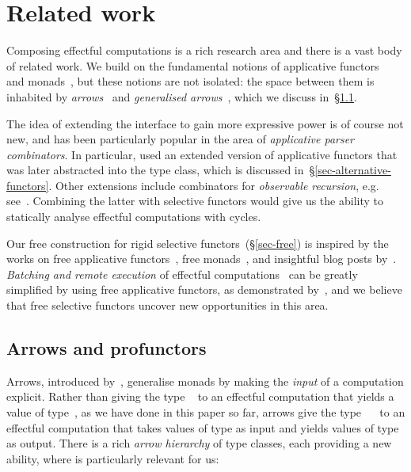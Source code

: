 \section{Related work}\label{sec-related}

Composing effectful computations is a rich research area and there is a vast
body of related work. We build on the fundamental notions of applicative
functors~\citep{mcbride2008applicative} and
monads~\citep{moggi1991notions,1995_wadler_monads}, but these notions are not
isolated: the space between them is inhabited by
\emph{arrows}~\citep{hughes2000arrows} and \emph{generalised
arrows}~\citep{megacz2011hardware}, which we discuss in~\S\ref{sec-arrows}.

The idea of extending the  interface to gain more expressive
power is of course not new, and has been particularly popular in
the area of \emph{applicative parser combinators}. In particular,
\citet{swierstra1996parsers} used an extended version of applicative functors
that was later abstracted into the  type class, which is
discussed in~\S\ref{sec-alternative-functors}. Other extensions include
combinators for \emph{observable recursion}, e.g.
see~\citep{devriese2012finally,devriese2013fixing}. Combining the latter with
selective functors would give us the ability to statically analyse effectful
computations with cycles.

Our free construction for rigid selective functors~(\S\ref{sec-free}) is
inspired by the works on free applicative functors~\citep{free-applicatives},
free monads~\citep{swierstra2008data}, and insightful blog posts
by~\citet{fancher2016free,fancher2017static}. \emph{Batching and remote
execution} of effectful computations~\citep{gill2015remote} can be greatly
simplified by using free applicative functors, as
demonstrated by~\citet{gibbons2016free}, and we believe that free selective
functors uncover new opportunities in this area.

\subsection{Arrows and profunctors}\label{sec-arrows}

Arrows, introduced by~\citet{hughes2000arrows}, generalise monads by making the
\emph{input} of a computation explicit. Rather than giving the type
~ to an effectful computation that yields a value of type~, as
we have done in this paper so far, arrows give the type ~~ to
an effectful computation that takes values of type  as input and yields
values of type  as output. There is a rich \emph{arrow hierarchy} of type
classes, each providing a new ability, where  is particularly
relevant for us:


